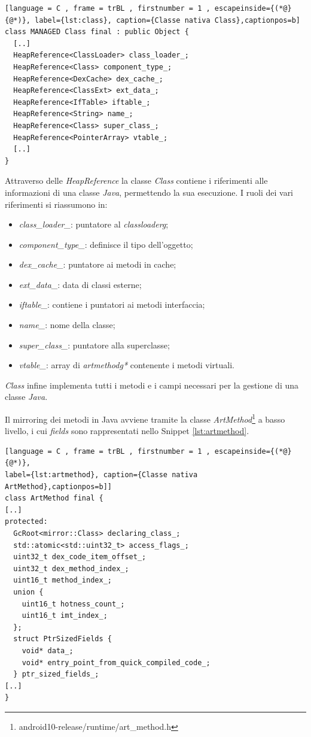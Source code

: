 \begin{lstlisting}[language = C , frame = trBL , firstnumber = 1 , escapeinside={(*@}{@*)}, label={lst:class}, caption={Classe nativa Class},captionpos=b]
class MANAGED Class final : public Object {
  [..]
  HeapReference<ClassLoader> class_loader_;
  HeapReference<Class> component_type_;
  HeapReference<DexCache> dex_cache_;
  HeapReference<ClassExt> ext_data_;
  HeapReference<IfTable> iftable_;
  HeapReference<String> name_;
  HeapReference<Class> super_class_;
  HeapReference<PointerArray> vtable_;
  [..]
}
\end{lstlisting}

Attraverso delle \emph{HeapReference} la classe \emph{Class} contiene i riferimenti alle informazioni di una classe \emph{Java}, permettendo la sua esecuzione. I ruoli dei vari riferimenti si riassumono in:

\begin{itemize}
    \item \emph{class\_loader\_}: puntatore al \emph{\gls{classloaderg}}\glsfirstoccur;
    \item \emph{component\_type\_}: definisce il tipo dell'oggetto;
    \item \emph{dex\_cache\_}: puntatore ai metodi in cache;
    \item \emph{ext\_data\_}: data di classi esterne;
    \item \emph{iftable\_}: contiene i puntatori ai metodi interfaccia;
    \item \emph{name\_}: nome della classe;
    \item \emph{super\_class\_}: puntatore alla superclasse;
    \item \emph{vtable\_}: array di \emph{\gls{artmethodg}*} contenente i metodi virtuali.
\end{itemize}

\emph{Class} infine implementa tutti i metodi e i campi necessari per la gestione di una classe \emph{Java}.

\newpage

Il mirroring dei metodi in Java avviene tramite la classe \emph{ArtMethod}\footnote{android10-release/runtime/art\_method.h} a basso livello, i cui \emph{fields} sono rappresentati nello Snippet \ref{lst:artmethod}.


\begin{lstlisting}[language = C , frame = trBL , firstnumber = 1 , escapeinside={(*@}{@*)},
label={lst:artmethod}, caption={Classe nativa ArtMethod},captionpos=b]]
class ArtMethod final {
[..]
protected:
  GcRoot<mirror::Class> declaring_class_;
  std::atomic<std::uint32_t> access_flags_;
  uint32_t dex_code_item_offset_;
  uint32_t dex_method_index_;
  uint16_t method_index_;
  union {
    uint16_t hotness_count_;
    uint16_t imt_index_;
  };
  struct PtrSizedFields {
    void* data_;
    void* entry_point_from_quick_compiled_code_;
  } ptr_sized_fields_;
[..]
}
\end{lstlisting}

